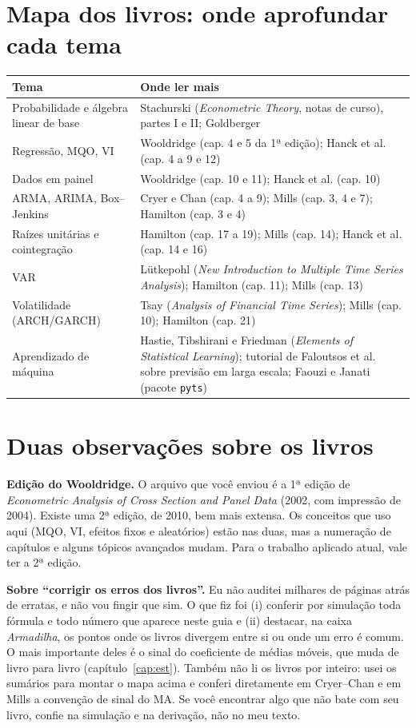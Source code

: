 \section*{Mapa dos livros: onde aprofundar cada tema}
\begin{center}
\small
\begin{tabular}{p{4.3cm}p{9.6cm}}
\toprule
\textbf{Tema} & \textbf{Onde ler mais} \\
\midrule
Probabilidade e álgebra linear de base & Stachurski (\emph{Econometric Theory}, notas de curso), partes I e II; Goldberger \\
Regressão, MQO, VI & Wooldridge (cap. 4 e 5 da 1ª edição); Hanck et al. (cap. 4 a 9 e 12) \\
Dados em painel & Wooldridge (cap. 10 e 11); Hanck et al. (cap. 10) \\
ARMA, ARIMA, Box--Jenkins & Cryer e Chan (cap. 4 a 9); Mills (cap. 3, 4 e 7); Hamilton (cap. 3 e 4) \\
Raízes unitárias e cointegração & Hamilton (cap. 17 a 19); Mills (cap. 14); Hanck et al. (cap. 14 e 16) \\
VAR & Lütkepohl (\emph{New Introduction to Multiple Time Series Analysis}); Hamilton (cap. 11); Mills (cap. 13) \\
Volatilidade (ARCH/GARCH) & Tsay (\emph{Analysis of Financial Time Series}); Mills (cap. 10); Hamilton (cap. 21) \\
Aprendizado de máquina & Hastie, Tibshirani e Friedman (\emph{Elements of Statistical Learning}); tutorial de Faloutsos et al. sobre previsão em larga escala; Faouzi e Janati (pacote \texttt{pyts}) \\
\bottomrule
\end{tabular}
\end{center}

\section*{Duas observações sobre os livros}
\textbf{Edição do Wooldridge.} O arquivo que você enviou é a 1ª edição de \emph{Econometric Analysis of Cross Section and Panel Data} (2002, com impressão de 2004). Existe uma 2ª edição, de 2010, bem mais extensa. Os conceitos que uso aqui (MQO, VI, efeitos fixos e aleatórios) estão nas duas, mas a numeração de capítulos e alguns tópicos avançados mudam. Para o trabalho aplicado atual, vale ter a 2ª edição.

\textbf{Sobre ``corrigir os erros dos livros''.} Eu não auditei milhares de páginas atrás de erratas, e não vou fingir que sim. O que fiz foi (i) conferir por simulação toda fórmula e todo número que aparece neste guia e (ii) destacar, na caixa \emph{Armadilha}, os pontos onde os livros divergem entre si ou onde um erro é comum. O mais importante deles é o sinal do coeficiente de médias móveis, que muda de livro para livro (capítulo~\ref{cap:est}). Também não li os livros por inteiro: usei os sumários para montar o mapa acima e conferi diretamente em Cryer--Chan e em Mills a convenção de sinal do MA. Se você encontrar algo que não bate com seu livro, confie na simulação e na derivação, não no meu texto.

